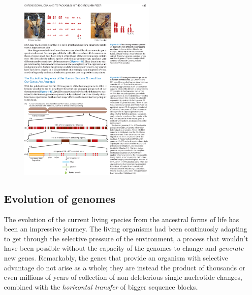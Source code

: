 \begin{figure}[h]
	\begin{minipage}[b]{\linewidth}
	  \centering
	  \includegraphics*[width=0.6\textwidth]{figures/chap1_genes_full}
	  \caption{}
	  \label{fig:chap1:genes}
   \end{minipage}
\end{figure}

\subsection{Evolution of genomes}
\label{sec:chap1:genome-evolution}

The evolution of the current living species from the ancestral forms
of life has been an impressive journey. The living organisms had been
continuosly adapting to get through the selective pressure of the
environment, a process that wouldn't have been possible without the
capacity of the genomes to change and {\em generate} new
genes. Remarkably, the genes that provide  an organism with selective
advantage do not arise as a whole; they are instead the product of
thousands or even millions of years of collection of non-deleterious
single nucleotide changes, combined with the {\em horizontal transfer} of
bigger sequence blocks. 

